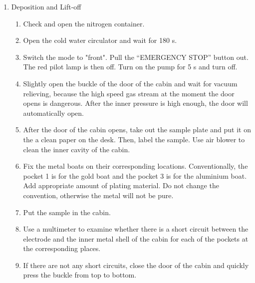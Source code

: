 \documentclass[journal,svgnames,twocolumn,x11names]{IEEEtran}
\begin{document}
\begin{enumerate}
    \item Deposition and Lift-off
    \\
        \begin{enumerate}
            \item Check and open the nitrogen container.
            \item Open the cold water circulator and wait for 180 s.
            \item Switch the mode to "front". Pull the “EMERGENCY STOP” button out. The red pilot lamp is then off. Turn on the pump for 5 s and turn off.
            \item Slightly open the buckle of the door of the cabin and wait for vacuum relieving, because the high speed gas stream at the moment the door opens is dangerous. After the inner pressure is high enough, the door will automatically open.
            \item After the door of the cabin opens, take out the sample plate and put it on the a clean paper on the desk. Then, label the sample. Use air blower to clean the inner cavity of the cabin.
            \item Fix the metal boats on their corresponding locations. Conventionally, the pocket 1 is for the gold boat and the pocket 3 is for the aluminium boat. Add appropriate amount of plating material. Do not change the convention, otherwise the metal will not be pure.
            \item Put the sample in the cabin.
            \item Use a multimeter to examine whether there is a short circuit between the electrode and the inner metal shell of the cabin for each of the pockets at the corresponding places.
            \item If there are not any short circuits, close the door of the cabin and quickly press the buckle from top to bottom.
            

\end{enumerate}
\end{enumerate}
\end{document}
